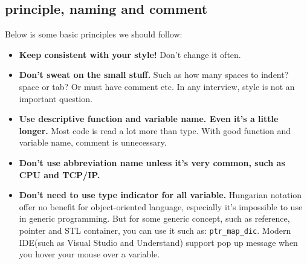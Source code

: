 \documentclass[a4paper,11pt,twoside]{book}
\begin{document}
\subsection{principle, naming and comment}
Below is some basic principles we should follow:
\begin{itemize}
	\item \textbf{Keep consistent with your style!} Don't change it often.
	
	\item \textbf{Don't sweat on the small stuff.} Such as how many spaces to indent? space or tab? Or must have comment etc. In any interview, style is not an important question.
	
	\item \textbf{Use descriptive function and variable name. Even it's a little longer.} Most code is read a lot more than type. With good function and variable name, comment is unnecessary.
	
	\item \textbf{Don't use abbreviation name unless it's very common, such as CPU and TCP/IP.}
	
	\item \textbf{Don't need to use type indicator for all variable.} Hungarian notation offer no benefit for object-oriented language, especially it's impossible to use in generic programming. But for some generic concept, such as reference, pointer and STL container, you can use it such as: \texttt{ptr\_map\_dic}. Modern IDE(such as Visual Studio and Understand) support pop up message when you hover your mouse over a variable.
\end{itemize}
\end{document}
